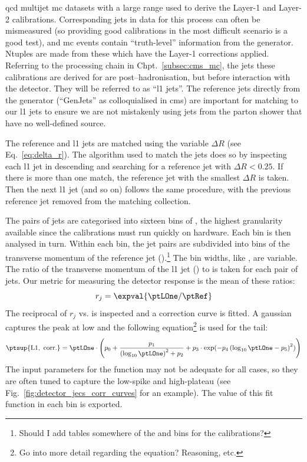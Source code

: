 \acrshort{qcd} multijet \acrshort{mc} datasets with a large \pt range used to derive the Layer-1 and Layer-2 calibrations. Corresponding \glspl{jet} in data for this process can often be mismeasured (so providing good calibrations in the most difficult scenario is a good test), and \acrshort{mc} events contain ``truth-level'' information from the generator. Ntuples are made from these which have the Layer-1 corrections applied. Referring to the processing chain in Chpt.~\ref{subsec:cms_mc}, the \glspl{jet} these calibrations are derived for are post--hadronisation, but before interaction with the detector. They will be referred to as ``\acrfull{l1} \glspl{jet}''. The reference \glspl{jet} directly from the generator (``GenJets'' as colloquialised in \acrshort{cms}) are important for matching to our \acrshort{l1} \glspl{jet} to ensure we are not mistakenly using \glspl{jet} from the parton shower that have no well-defined source.

The reference and \acrshort{l1} \glspl{jet} are matched using the variable $\Delta R$ (see Eq.~\ref{eq:delta_r}). The algorithm used to match the \glspl{jet} does so by inspecting each \acrshort{l1} \gls{jet} in descending \pt and searching for a reference \gls{jet} with $\Delta R < 0.25$. If there is more than one match, the reference \gls{jet} with the smallest $\Delta R$ is taken. Then the next \acrshort{l1} jet (and so on) follows the same procedure, with the previous reference \gls{jet} removed from the matching collection.

The pairs of \glspl{jet} are categorised into sixteen bins of \abseta, the highest granularity available since the calibrations must run quickly on hardware. Each bin is then analysed in turn. Within each \abseta bin, the \gls{jet} pairs are subdivided into bins of the transverse momentum of the reference \gls{jet} (\ptRef).\footnote{Should I add tables somewhere of the \ptRef and \abseta bins for the calibrations?} The bin widths, like \abseta, are variable. The ratio of the transverse momentum of the \acrshort{l1} \gls{jet} (\ptLOne) to \ptRef is taken for each pair of \glspl{jet}. Our metric for measuring the detector response is the mean of these ratios:
\begin{equation}
    r_j = \expval{\ptLOne / \ptRef}
    \label{eq:jec_detector_response}
\end{equation}
The reciprocal of $r_j$ vs. \ptLOne is inspected and a correction curve is fitted. A gaussian captures the peak at low \pt and the following equation\footnote{Go into more detail regarding the equation? Reasoning, etc.} is used for the tail:
\begin{equation}
    \ptsup{{\mathrm{L1, \ corr.}}} = \ptLOne \cdot \left( p_0 + \frac{p_1}{ \left(\log_{10} \ptLOne \right) ^2 + p_2 } + p_3 \cdot \exp(-p_4 \left( \log_{10} \ptLOne - p_5 \right)^2) \right)
    \label{eq:corr_curve_jec_tail}
\end{equation}
The input parameters for the function may not be adequate for all cases, so they are often tuned to capture the low-\pt spike and high-\pt plateau (see Fig.~\ref{fig:detector_jecs_corr_curves} for an example). The value of this fit function in each \ptRef bin is exported.

